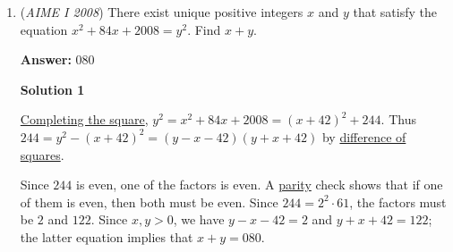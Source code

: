 \begin{enumerate}
 When readdressing the first equation, we see that if $2x+3y$ will be a multiple of $6$, $4z \equiv 2 \pmod{6} = 5$, we get that $x=15$ and $y=8$, which works because of integer values. Therefore, $225+64+25=\boxed{314}.$




\textbf{Solution 4 (Logic)}

Building on top of Solution 3, we can add $j+s-2b=17$ and $2b+3j+4s=74$ (sorry, I used different variables) to get $4j+5s=57$. Logically speaking, most athletic people swim a lot faster than 1 km/h (0.62 mph), so we test out the next case that works, which is 5 km/h (3.1 mph). This seems much more logical, so we plug it into the equation to get $4j+25=57\implies j=8$. This seems reasonable, as people usually jog at around 8 to 16 km/h. Plugging these values into $2b+3j+4s=74$, we get $b=15$. 15 km/h is a little slow (most people bike at 20 km/h), but is still reasonable. So, we get $5^2+8^2+15^2=\boxed{314}$.

 Note: Solving $4j+5s=57$ yields 3 solutions for $(j,s)$: $(13,1),(8,5),(3,9)$, and only $(8,5)$ gives us an integer $b$ value and we don't need the assumption, which is also false, since swimming at $5 km/h$ over $4$ hours is also pretty insane, so none of the swimming speeds make any sense.

 


	\item (\textit{AIME I 2008}) There exist unique positive integers $x$ and $y$ that satisfy the equation $x^2 + 84x + 2008 = y^2$. Find $x + y$.


 
 \textbf{Answer: }080



\textbf{Solution 1}

\href{https://artofproblemsolving.com/wiki/index.php?title=Completing\_the\_square}{Completing the square}, $y^2 = x^2 + 84x + 2008 = (x+42)^2 + 244$. Thus $244 = y^2 - (x+42)^2 = (y - x - 42)(y + x + 42)$ by \href{https://artofproblemsolving.com/wiki/index.php?title=Difference\_of\_squares}{difference of squares}. 

 Since $244$ is even, one of the factors is even. A \href{https://artofproblemsolving.com/wiki/index.php?title=Parity}{parity} check shows that if one of them is even, then both must be even. Since $244 = 2^2 \cdot 61$, the factors must be $2$ and $122$. Since $x,y > 0$, we have $y - x - 42 = 2$ and $y + x + 42 = 122$; the latter equation implies that $x + y = \boxed{080}$. 


\end{enumerate}
